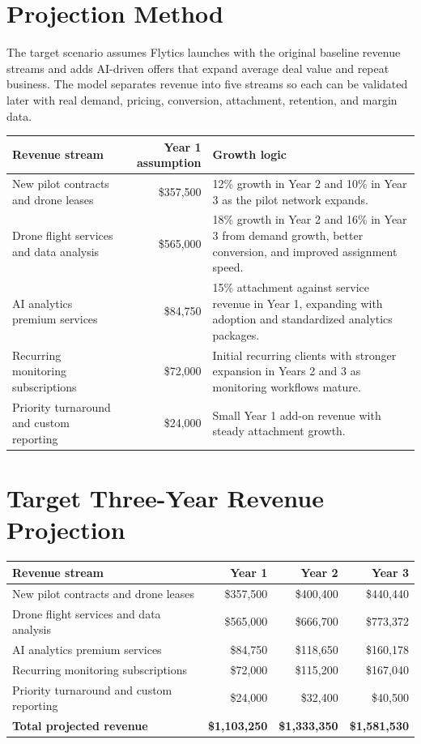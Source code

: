 \documentclass[11pt,a4paper]{article}
\begin{document}
\section{Projection Method}

The target scenario assumes Flytics launches with the original baseline revenue streams and adds AI-driven offers that expand average deal value and repeat business. The model separates revenue into five streams so each can be validated later with real demand, pricing, conversion, attachment, retention, and margin data.

\begin{longtable}{p{}r p{}}
\toprule
\textbf{Revenue stream} & \textbf{Year 1 assumption} & \textbf{Growth logic} \\
\midrule
New pilot contracts and drone leases & \$357,500 & 12\% growth in Year 2 and 10\% in Year 3 as the pilot network expands. \\
Drone flight services and data analysis & \$565,000 & 18\% growth in Year 2 and 16\% in Year 3 from demand growth, better conversion, and improved assignment speed. \\
AI analytics premium services & \$84,750 & 15\% attachment against service revenue in Year 1, expanding with adoption and standardized analytics packages. \\
Recurring monitoring subscriptions & \$72,000 & Initial recurring clients with stronger expansion in Years 2 and 3 as monitoring workflows mature. \\
Priority turnaround and custom reporting & \$24,000 & Small Year 1 add-on revenue with steady attachment growth. \\
\bottomrule
\end{longtable}

\section{Target Three-Year Revenue Projection}

\begin{longtable}{p{}r r r}
\toprule
\textbf{Revenue stream} & \textbf{Year 1} & \textbf{Year 2} & \textbf{Year 3} \\
\midrule
New pilot contracts and drone leases & \$357,500 & \$400,400 & \$440,440 \\
Drone flight services and data analysis & \$565,000 & \$666,700 & \$773,372 \\
AI analytics premium services & \$84,750 & \$118,650 & \$160,178 \\
Recurring monitoring subscriptions & \$72,000 & \$115,200 & \$167,040 \\
Priority turnaround and custom reporting & \$24,000 & \$32,400 & \$40,500 \\
\textbf{Total projected revenue} & \textbf{\$1,103,250} & \textbf{\$1,333,350} & \textbf{\$1,581,530} \\
\bottomrule
\end{longtable}
\end{document}
